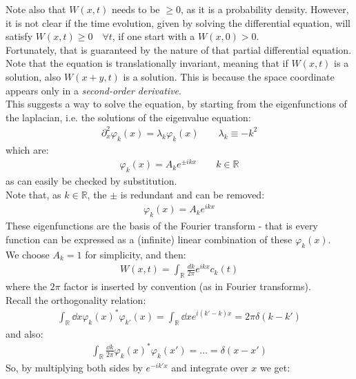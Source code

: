 \documentclass[../template.tex]{subfiles}
\begin{document}
Note also that $W(x,t)$ needs to be $\geq 0$, as it is a probability density. However, it is not clear if the time evolution, given by solving the differential equation, will satisfy $W(x,t) \geq 0 \quad \forall t$, if one start with a $W(x,0) > 0$.\\
Fortunately, that is guaranteed by the nature of that partial differential equation.\\

Note that the equation is translationally invariant, meaning that if $W(x,t)$ is a solution, also $W(x + y,t)$ is a solution. This is because the space coordinate appears only in a \textit{second-order derivative}.\\
This suggests a way to solve the equation, by starting from the eigenfunctions of the laplacian, i.e. the solutions of the eigenvalue equation:
\begin{align*}
    \partial_x^2 \varphi_k(x) = \lambda_k \varphi_k(x) \qquad \lambda_k \equiv -k^2
\end{align*}
which are:
\begin{align*}
    \varphi_k(x) = A_k e^{\pm i k x} \qquad k\in \mathbb{R}
\end{align*}
as can easily be checked by substitution.\\
Note that, as $k \in \mathbb{R}$, the $\pm$ is redundant and can be removed:
\begin{align*}
    \varphi_k(x) = A_k e^{ikx}
\end{align*}  
These eigenfunctions are the basis of the Fourier transform - that is every function can be expressed as a (infinite) linear combination of these $\varphi_k(x)$.\\
We choose $A_k = 1$ for simplicity, and then:
\begin{align*}
    W(x,t) = \int_{\mathbb{R}} \frac{dk}{2 \pi} e^{ikx} c_k(t) 
\end{align*}  
where the $2\pi$ factor is inserted by convention (as in Fourier transforms).\\
Recall the orthogonality relation:
\begin{align*}
    \int_{\mathbb{R}} \dd{x} \varphi_k(x)^* \varphi_{k'}(x) = \int_{\mathbb{R}} \dd{x} e^{i(k'-k)x} = 2\pi \delta(k-k')
\end{align*} 
and also:
\begin{align*}
    \int_{\mathbb{R}} \frac{\dd{k}}{2 \pi} \varphi_k(x)^* \varphi_k (x') = \dots = \delta(x-x') 
\end{align*}
So, by multiplying both sides by $e^{-ik'x}$ and integrate over $x$ we get:
\end{document}
